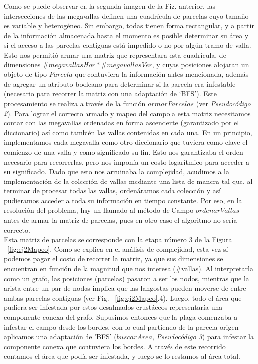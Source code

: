 Como se puede observar en la segunda imagen de la Fig. anterior, las intersecciones de las megavallas definen una cuadrícula de parcelas cuyo tamaño es variable y heterogéneo. Sin embargo, todas tienen forma rectangular, y a partir de la información almacenada hasta el momento es posible determinar su área y si el acceso a las parcelas contiguas está impedido o no por algún tramo de valla. Esto nos permitió armar una matriz que representara esta cuadrícula, de dimensiones $\#megavallasHor*\#megavallasVer$, y cuyas posiciones alojaran un objeto de tipo $Parcela$ que contuviera la información antes mencionada, además de agregar un atributo booleano para determinar si la parcela era infestable (necesario para recorrer la matriz con una adaptación de `BFS'). Este procesamiento se realiza a través de la función $armarParcelas$ (ver \textsl{Pseudocódigo 2}). Para lograr el correcto armado y mapeo del campo a esta matriz necesitamos contar con las megavallas ordenadas en forma ascendente (garantizado por el diccionario) así como también las vallas contenidas en cada una. En un principio, implementamos cada megavalla como otro diccionario que tuviera como clave el comienzo de una valla y como significado su fin. Esto nos garantizaba el orden necesario para recorrerlas, pero nos imponía un costo logarítmico para acceder a su significado. Dado que esto nos arruinaba la complejidad, acudimos a la implementación de la colección de vallas mediante una lista de manera tal que, al terminar de procesar todas las vallas, ordenáramos cada colección y así pudieramos acceder a toda su información en tiempo constante. Por eso, en la resolución del problema, hay un llamado al método de Campo $ordenarVallas$ antes de armar la matriz de parcelas, pues en otro caso el algoritmo no sería correcto.\\
\indent Esta matriz de parcelas se corresponde con la etapa número 3 de la Figura ~\ref{fig:ej2Mapeo}. Como se explica en el análisis de complejidad, esta vez sí podemos pagar el costo de recorrer la matriz, ya que sus dimensiones se encuentran en función de la magnitud que nos interesa (\#vallas). Al interpretarla como un grafo, las posiciones (parcelas) pasaron a ser los nodos, mientras que la arista entre un par de nodos implica que las langostas pueden moverse de entre ambas parcelas contiguas (ver Fig. ~\ref{fig:ej2Mapeo}.4). Luego, todo el área que pudiera ser infestada por estos desalmados crustáceos representaría una componente conexa del grafo. Supusimos entonces que la plaga comenzaba a infestar el campo desde los bordes, con lo cual partiendo de la parcela origen aplicamos una adaptación de 'BFS' ($buscarArea$, \textsl{Pseudocódigo 3}) para infestar la componente conexa que contuviera los bordes. A través de este recorrido contamos el área que podía ser infestada, y luego se lo restamos al área total.

